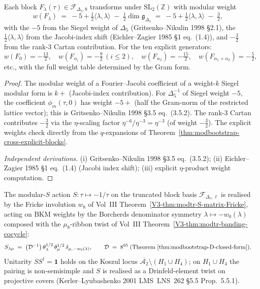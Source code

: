 \begin{proposition}
\label{prop:modbootstrap-cross-explicit-weight}
\ClaimStatusConditional
{}
Each block $F_\lambda(\tau)\in\mathcal F_{\Delta_5, 8}$ transforms
under $\mathrm{SL}_2(\mathbb Z)$ with modular weight
\[
 w(F_\lambda)
 \;=\;
 -5 + \tfrac{1}{2}\langle\lambda, \lambda\rangle
 \;-\; \tfrac{1}{2}\dim\mathfrak g_{\Delta_5}
 \;=\;
 -5 + \tfrac{1}{2}\langle\lambda, \lambda\rangle
 \;-\;\tfrac{3}{2},
\]
with the $-5$ from the Siegel weight of $\Delta_5$
(Gritsenko--Nikulin 1998 \S 2.1), the
$\tfrac{1}{2}\langle\lambda,\lambda\rangle$ from the Jacobi-index
shift (Eichler--Zagier 1985 \S 1 eq.~(1.4)), and $-\tfrac{3}{2}$
from the rank-$3$ Cartan contribution. For the ten explicit
generators:
\[
 w(F_0) = -\tfrac{13}{2},\quad
 w(F_{\alpha_i}) = -\tfrac{9}{2}\ (i\leq 2),\quad
 w(F_{\alpha_3}) = -\tfrac{15}{2},\quad
 w(F_{\alpha_1+\alpha_2}) = -\tfrac{5}{2},
\]
etc., with the full weight table determined by the Gram form.
\end{proposition}

\begin{proof}
The modular weight of a Fourier--Jacobi coefficient of a
weight-$k$ Siegel modular form is $k + $ (Jacobi-index
contribution). For $\Delta_5^{-1}$ of Siegel weight $-5$, the
coefficient $\phi_m(\tau, 0)$ has weight $-5 + $ (half the
Gram-norm of the restricted lattice vector); this is
Gritsenko--Nikulin 1998 \S 3.5 eq.~(3.5.2). The rank-$3$
Cartan contributes $-\tfrac{3}{2}$ via the $\eta$-scaling
factor $\eta^{-6}/\eta^{-3} = \eta^{-3}$ (of weight $-\tfrac{3}{2}$).
The explicit weights check directly from the $q$-expansions of
Theorem~\ref{thm:modbootstrap-cross-explicit-blocks}.

\emph{Independent derivations.}
(i) Gritsenko--Nikulin 1998 \S 3.5 eq.~(3.5.2);
(ii) Eichler--Zagier 1985 \S 1 eq.~(1.4) (Jacobi index shift);
(iii) explicit $\eta$-product weight computation.
\end{proof}

\begin{theorem}
\label{thm:modbootstrap-cross-Smatrix}
\ClaimStatusConditional
The modular-$S$ action
$S : \tau\mapsto -1/\tau$ on the truncated block basis
$\mathcal F_{\Delta_5, \ell}$ is realised by the
Fricke involution $w_8$ of Vol~III
Theorem~\ref{V3-thm:modtr-S-matrix-Fricke}, acting on
BKM weights by the Borcherds denominator symmetry
$\lambda\mapsto -w_0(\lambda)$ composed with the
$\mu_8$-ribbon twist of Vol~III
Theorem~\ref{V3-thm:modtr-banding-cocycle}:
\[
 S_{\lambda\mu}
 \;=\;
 \bigl(\mathcal D^{-1}\bigr)\,
 \theta_\lambda^{1/2}\,\theta_\mu^{1/2}\,
 \delta_{\mu,\,-w_0(\lambda)},
 \qquad
 \mathcal D \;=\; 8^{65}
 \;\text{(Theorem~\ref{thm:modbootstrap-D-closed-form})}.
\]
Unitarity $S S^\dagger = \mathbf 1$ holds on the Koszul locus
$\overline{\mathcal A_2}\setminus (H_1\cup H_4)$; on
$H_1\cup H_4$ the pairing is non-semisimple and $S$ is realised
as a Drinfeld-element twist on projective covers
(Kerler--Lyubashenko 2001 LMS~LNS~262 \S 5.5 Prop.~5.5.1).
\end{theorem}

